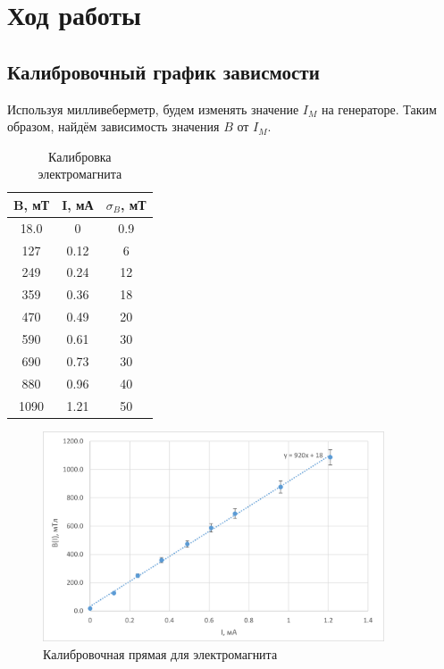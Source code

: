 \newpage

\section{Ход работы}

\subsection{Калибровочный график зависмости}

Используя милливеберметр, будем изменять значение $I_M$ на генераторе. Таким образом, найдём зависимость значения $B$ от $I_M$.

\begin{table}[H]
\centering
\caption{Калибровка электромагнита}
\label{t1}
\begin{tabular}{|c|c|c|}
\hline
\rowcolor[HTML]{A9D08E} 
B, мТ & I, мА & $\sigma_{B}$, мТ \\ \hline
18.0  & 0    & 0.9              \\ \hline
127   & 0.12 & 6                \\ \hline
249   & 0.24 & 12               \\ \hline
359   & 0.36 & 18               \\ \hline
470   & 0.49 & 20               \\ \hline
590   & 0.61 & 30               \\ \hline
690   & 0.73 & 30               \\ \hline
880   & 0.96 & 40               \\ \hline
1090  & 1.21 & 50               \\ \hline
\end{tabular}
\end{table}\begin{figure}[H]
    \centering
    \includegraphics[width=0.9\textwidth]{pictures/калибр.png}
    \caption{Калибровочная прямая для электромагнита}
\end{figure} 

